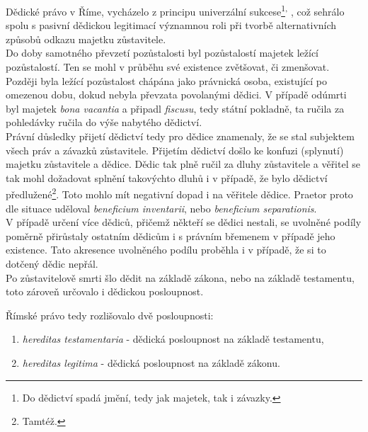 \documentclass{article}
\begin{document}
Dědické právo v Říme, vycházelo z principu univerzální sukcese\footnote{Do dědictví spadá jmění, tedy jak majetek, tak i závazky.}\textsuperscript{,} , což sehrálo spolu s pasivní dědickou legitimací významnou roli při tvorbě alternativních způsobů odkazu majetku zůstavitele. \\

Do doby samotného převzetí pozůstalosti byl pozůstalostí majetek ležící pozůstalostí. Ten se mohl v průběhu své existence zvětšovat, či zmenšovat. Později byla ležící pozůstalost chápána jako právnická osoba, existující po ome\-zenou dobu, dokud nebyla převzata povolanými dědici. V případě odúmrti byl majetek \textit{bona vacantia} a připadl \textit{fiscusu}, tedy státní pokladně, ta ručila za pohledávky ručila do výše nabytého dědictví.\\

Právní důsledky přijetí dědictví tedy pro dědice znamenaly, že se stal subjektem všech práv a závazků zůstavitele. Přijetím dědictví došlo ke konfuzi (splynutí) majetku zůstavitele a dědice. Dědic tak plně ručil za dluhy zůstavitele a věřitel se tak mohl dožadovat splnění takovýchto dluhů i v případě, že bylo dědictví předlužené\footnote{Tamtéž.}. Toto mohlo mít negativní dopad i na věřitele dědice. Praetor proto dle situace uděloval \textit{beneficium inventarii}, nebo \textit{beneficium separationis}.\\

V případě určení více dědiců, přičemž někteří se dědici nestali, se uvolněné podíly poměrně přirůstaly ostatním dědicům i s právním břemenem v případě jeho existence. Tato akresence uvolněného podílu proběhla i v případě, že si to dotčený dědic nepřál.\\


Po zůstavitelově smrti šlo dědit na základě zákona, nebo na základě testamentu, toto zároveň určovalo i dědickou posloupnost. \\

\vspace{5 mm}

Římské právo tedy rozlišovalo dvě posloupnosti:
\begin{enumerate}
\item \textit{hereditas testamentaria} - dědická posloupnost na základě testamentu,
\item \textit{hereditas legitima} - dědická posloupnost na základě zákonu.
\end{enumerate}
\end{document}
